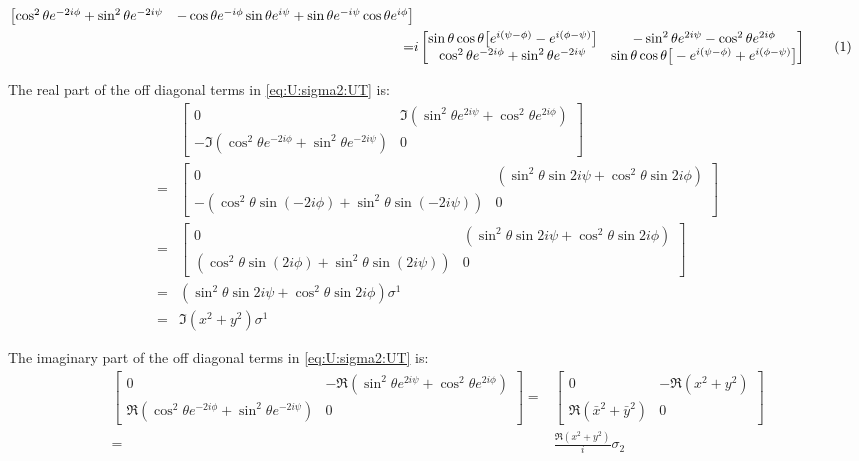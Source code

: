 \documentclass[]{article}
\newcommand\numberthis{\addtocounter{equation}{1}\tag{\theequation}}
\begin{document}
\begin{align*}
\begin{bmatrix}
	   	\cos^2{\theta} e^{-2i\phi}+\sin^2{\theta}e^{-2i\psi}&-\cos{\theta} e^{-i\phi}\sin{\theta}e^{i\psi}+\sin{\theta}e^{-i\psi}\cos{\theta} e^{i\phi}
   \end{bmatrix} \\
	=& i \begin{bmatrix}
		\sin{\theta}\cos{\theta}\big[e^{i(\psi-\phi)}-e^{i(\phi-\psi)}\big]&-\sin^2{\theta}e^{2i\psi}-\cos^2{\theta} e^{2i\phi}\\
		\cos^2{\theta} e^{-2i\phi}+\sin^2{\theta}e^{-2i\psi}&\sin{\theta}\cos{\theta}\big[-e^{i(\psi-\phi)}+e^{i(\phi-\psi)}\big]
	\end{bmatrix} \numberthis \label{eq:U:sigma2:UT}
\end{align*}

The real part of the off diagonal terms in \eqref{eq:U:sigma2:UT} is:
\begin{align*}
	 &\begin{bmatrix}
		0&\Im(\sin^2{\theta}e^{2i\psi}+\cos^2{\theta} e^{2i\phi})\\
		-\Im(\cos^2{\theta} e^{-2i\phi}+\sin^2{\theta}e^{-2i\psi})&0
	\end{bmatrix}\\
   =& \begin{bmatrix}
		0&(\sin^2{\theta}\sin{2i\psi}+\cos^2{\theta} \sin{2i\phi})\\
		-(\cos^2{\theta} \sin({-2i\phi})+\sin^2{\theta}\sin({-2i\psi}))&0
	\end{bmatrix}\\
	=& \begin{bmatrix}
	0&(\sin^2{\theta}\sin{2i\psi}+\cos^2{\theta} \sin{2i\phi})\\
	(\cos^2{\theta} \sin({2i\phi})+\sin^2{\theta}\sin({2i\psi}))&0
	\end{bmatrix}\\
	=& (\sin^2{\theta}\sin{2i\psi}+\cos^2{\theta} \sin{2i\phi}) \sigma^1\\
	=& \Im(x^2 + y^2) \sigma^1
\end{align*}

The imaginary part of the off diagonal terms in \eqref{eq:U:sigma2:UT} is:
\begin{align*}
	\begin{bmatrix}
		0&-\Re({\sin^2{\theta}e^{2i\psi}+\cos^2{\theta} e^{2i\phi}})\\
		\Re({\cos^2{\theta} e^{-2i\phi}+\sin^2{\theta}e^{-2i\psi}})&0
	\end{bmatrix}
	=&\begin{bmatrix}
		0&-\Re(x^2+y^2)\\
		\Re(\bar{x}^2+\bar{y}^2)&0
	\end{bmatrix}\\
	=& \frac{\Re(x^2+y^2)}{i} \sigma_2
\end{align*}
\end{document}
